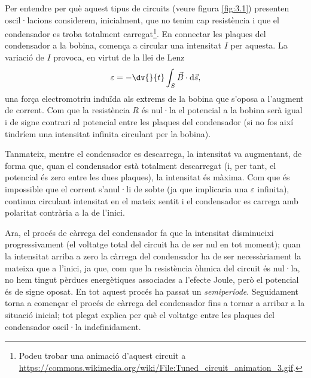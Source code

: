 \documentclass[a4paper,10.5pt]{report}
\begin{document}
Per entendre per què aquest tipus de circuits (veure figura \ref{fig:3.1}) presenten oscil·lacions considerem, inicialment, que no tenim cap resistència i que el condensador es troba totalment carregat\footnote{Podeu trobar una animació d'aquest circuit a \url{https://commons.wikimedia.org/wiki/File:Tuned_circuit_animation_3.gif}.}. En connectar les plaques del condensador a la bobina, comença a circular una intensitat $I$ per aquesta. La variació de $I$ provoca, en virtut de la llei de Lenz
\begin{equation}
	\varepsilon = - \dv{}{t}\int_S \vec{B} \cdot \mathrm{d}\vec{s} \label{eq:3.1},
\end{equation}
una força electromotriu induïda als extrems de la bobina que s'oposa a l'augment de corrent. Com que la resistència $R$ és nul·la el potencial a la bobina serà igual i de signe contrari al potencial entre les plaques del condensador (si no fos així tindríem una intensitat infinita circulant per la bobina). 

Tanmateix, mentre el condensador es descarrega, la intensitat va augmentant, de forma que, quan el condensador està totalment descarregat (i, per tant, el potencial és zero entre les dues plaques), la intensitat és màxima. Com que és impossible que el corrent s'anul·li de sobte (ja que implicaria una $\varepsilon$ infinita), continua circulant intensitat en el mateix sentit i el condensador es carrega amb polaritat contrària a la de l'inici. 

Ara, el procés de càrrega del condensador fa que la intensitat disminueixi progressivament (el voltatge total del circuit ha de ser nul en tot moment); quan la intensitat arriba a zero la càrrega del condensador ha de ser necessàriament la mateixa que a l'inici, ja que, com que la resistència òhmica del circuit és nul·la, no hem tingut pèrdues energètiques associades a l'efecte Joule, però el potencial és de signe oposat. En tot aquest procés ha passat un \textit{semiperíode}. Seguidament torna a començar el procés de càrrega del condensador fins a tornar a arribar a la situació inicial; tot plegat explica per què el voltatge entre les plaques del condensador oscil·la indefinidament.
\end{document}
